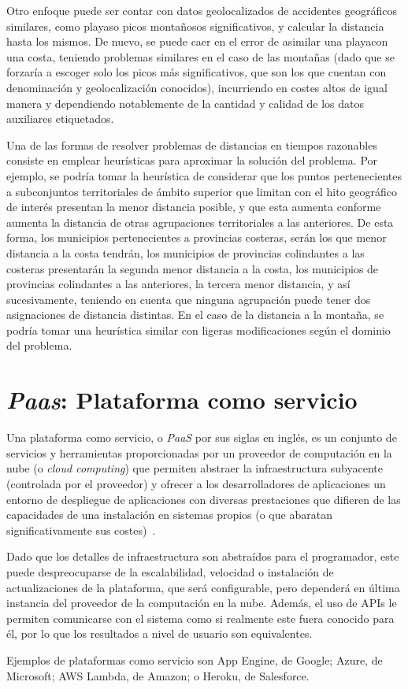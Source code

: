 Otro enfoque puede ser contar con datos geolocalizados de accidentes geográficos similares, como \guillemotleft playas\guillemotright\space o \guillemotleft picos montañosos significativos\guillemotright, y calcular la distancia hasta los mismos. De nuevo, se puede caer en el error de asimilar una \guillemotleft playa\guillemotright\space con una \guillemotleft costa\guillemotright, teniendo problemas similares en el caso de las montañas (dado que se forzaría a escoger solo los picos más significativos, que son los que cuentan con denominación y geolocalización conocidos), incurriendo en costes altos de igual manera y dependiendo notablemente de la cantidad y calidad de los datos auxiliares etiquetados.

Una de las formas de resolver problemas de distancias en tiempos razonables consiste en emplear heurísticas para aproximar la solución del problema. Por ejemplo, se podría tomar la heurística de considerar que los puntos pertenecientes a subconjuntos territoriales de ámbito superior que limitan con el hito geográfico de interés presentan la menor distancia posible, y que esta aumenta conforme aumenta la distancia de otras agrupaciones territoriales a las anteriores. De esta forma, los municipios pertenecientes a provincias costeras, serán los que menor distancia a la costa tendrán, los municipios de provincias colindantes a las costeras presentarán la segunda menor distancia a la costa, los municipios de provincias colindantes a las anteriores, la tercera menor distancia, y así sucesivamente, teniendo en cuenta que ninguna agrupación puede tener dos asignaciones de distancia distintas. En el caso de la distancia a la montaña, se podría tomar una heurística similar con ligeras modificaciones según el dominio del problema.

\section{\textit{Paas}: Plataforma como servicio}

Una plataforma como servicio, o \textit{PaaS} por sus siglas en inglés, es un conjunto de servicios y herramientas proporcionadas por un proveedor de computación en la nube (o \textit{cloud computing}) que permiten abstraer la infraestructura subyacente (controlada por el proveedor) y ofrecer a los desarrolladores de aplicaciones un entorno de despliegue de aplicaciones con diversas prestaciones que difieren de las capacidades de una instalación en sistemas propios (o que abaratan significativamente sus costes)~\cite{paas}.

Dado que los detalles de infraestructura son abstraídos para el programador, este puede despreocuparse de la escalabilidad, velocidad o instalación de actualizaciones de la plataforma, que será configurable, pero dependerá en última instancia del proveedor de la computación en la nube. Además, el uso de APIs le permiten comunicarse con el sistema como si realmente este fuera conocido para él, por lo que los resultados a nivel de usuario son equivalentes.

Ejemplos de plataformas como servicio son App Engine, de Google; Azure, de Microsoft; AWS Lambda, de Amazon; o Heroku, de Salesforce.